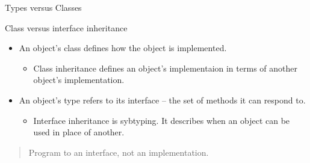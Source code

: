 \documentclass{beamer}
\begin{document}
\begin{frame}[fragile]{Types versus Classes}


Class versus interface inheritance
\begin{itemize}
\item An object's class defines how the object is implemented.
\begin{itemize}
\item Class inheritance defines an object's implementaion in terms of another object's implementation.
\end{itemize}
\item An object's type refers to its interface -- the set of methods it can respond to.
\begin{itemize}
\item Interface inheritance is sybtyping.  It describes when an object can be used in place of another.
\end{itemize}
\end{itemize}

\begin{quote}
Program to an interface, not an implementation.
\end{quote}

\end{frame}
\end{document}

